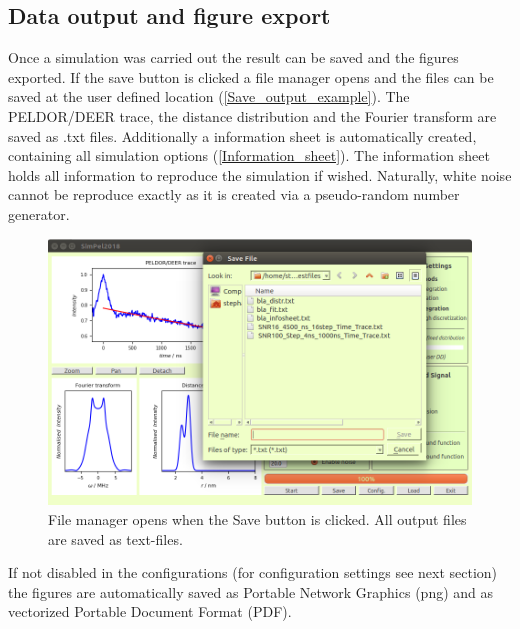 \documentclass[pdftex,bezier,german,a4,twoside, headexclude,12pt,nochapterprefix, titlepage]{extarticle}
\begin{document}
\subsection{Data output and figure export}
Once a simulation was carried out the result can be saved and the figures exported. If the save button is clicked a
file manager opens and the files can be saved at the user defined location (\autoref{Save_output_example}).
The PELDOR/DEER trace, the distance distribution and the Fourier transform are saved as .txt files. Additionally
a information sheet is automatically created, containing all simulation options (\autoref{Information_sheet}).
The information sheet holds all information to reproduce the simulation if wished. Naturally, white noise cannot
be reproduce exactly as it is created via a pseudo-random number generator.
\begin{figure}[!htb]
\centering
\includegraphics[scale=0.5]{Save_output_example.png}
    \caption{File manager opens when the Save button is clicked. All output files are saved as text-files.
    }
\label{Save_output_example}
\end{figure} 
If not disabled in the configurations (for configuration settings see next section) the figures are automatically
saved as Portable Network Graphics (png) and  as vectorized Portable Document Format (PDF).
\end{document}
